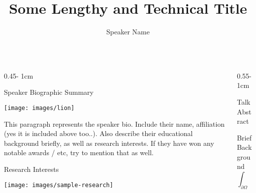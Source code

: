 \documentclass{psuposter}
\title{Some Lengthy and Technical Title}
\author{Speaker Name\inst{1}}
\institute{\inst{1} University of Speaker, Department of Speaker}
\begin{document}
\begin{frame}
\begin{columns}
\begin{column}{0.45\textwidth - 1cm}

    \begin{block}{Speaker Biographic Summary}
    	\begin{center}
	    	\texttt{[image: images/lion]}    		
    	\end{center}
        This paragraph represents the speaker bio. Include their name, affiliation (yes it is included above too..). Also describe their educational background briefly, as well as research interests. If they have won any notable awards / etc, try to mention that as well.
    \end{block}


    \begin{block}{Research Interests}
        \lipsum[2]
        \begin{center}
	    	\texttt{[image: images/sample-research]}    		
    	\end{center}
    \end{block}
\end{column}

\begin{column}{0.55\textwidth - 1cm}


    \begin{block}{Talk Abstract}
        \lipsum[4]
    \end{block}


    \begin{block}{Brief Background}
        \lipsum[2]
        \cite{DepartmentPhysicsEberly}
        $$\int_{\partial \Omega} \omega = \int_{\Omega} d \omega$$
        \lipsum[2]
        \cite{SearchArXivEprint}
    \end{block}



\end{column}
\end{columns}
\end{frame}
\end{document}
